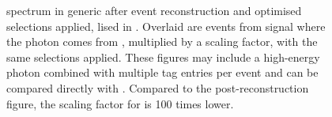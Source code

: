 \begin{figure}[htbp!]
    \centering
    \caption{\label{fig:spectrum_after_optimisation}\BtoXsgamma spectrum in generic \MC after event reconstruction and optimised selections applied, lised in .
    Overlaid are events from signal \MC where the photon comes from \BtoXsgamma, multiplied by a scaling factor, with the same selections applied.
    These figures may include a high-energy photon combined with multiple tag entries per event and can be compared directly with .
    Compared to the post-reconstruction figure, the scaling factor for \BtoXsgamma is 100 times lower.}
\end{figure}
